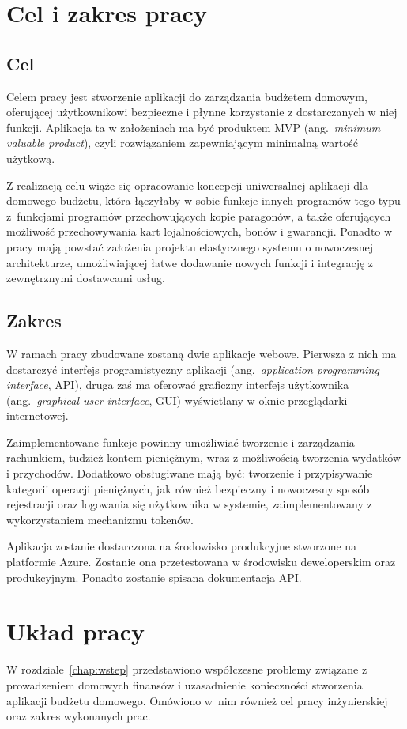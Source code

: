 \section{Cel i zakres pracy}
\label{sec:cel-zakres}
\subsection{Cel}
\label{subsec:cel}
Celem pracy jest stworzenie aplikacji do zarządzania budżetem domowym, oferującej użytkownikowi bezpieczne i płynne korzystanie z dostarczanych w niej funkcji.
Aplikacja ta w założeniach ma być produktem MVP (ang.~\emph{minimum valuable product}), czyli rozwiązaniem zapewniającym minimalną wartość użytkową.  

Z realizacją celu wiąże się opracowanie koncepcji uniwersalnej aplikacji dla domowego budżetu, która łączyłaby w sobie funkcje innych programów tego typu z~funkcjami programów przechowujących kopie paragonów, a także oferujących możliwość przechowywania kart lojalnościowych, bonów i gwarancji. 
Ponadto w pracy mają powstać założenia projektu elastycznego systemu o nowoczesnej architekturze, umożliwiającej łatwe dodawanie nowych funkcji i integrację z zewnętrznymi dostawcami usług. 

\subsection{Zakres}
\label{subsec:zakres}
W ramach pracy zbudowane zostaną dwie aplikacje webowe. Pierwsza z nich ma dostarczyć interfejs programistyczny aplikacji (ang.~\emph{application programming interface}, API), druga zaś ma oferować graficzny interfejs użytkownika (ang.~\emph{graphical user interface}, GUI) wyświetlany w oknie przeglądarki internetowej.

Zaimplementowane funkcje powinny umożliwiać tworzenie i zarządzania  rachunkiem, tudzież kontem pieniężnym, wraz z możliwością tworzenia wydatków i przychodów. Dodatkowo obsługiwane mają być: tworzenie i przypisywanie kategorii operacji pieniężnych, jak również bezpieczny i nowoczesny sposób rejestracji oraz logowania się użytkownika w systemie, zaimplementowany z wykorzystaniem mechanizmu tokenów.

Aplikacja zostanie dostarczona na środowisko produkcyjne stworzone na platformie Azure. Zostanie ona przetestowana w środowisku deweloperskim oraz produkcyjnym. Ponadto zostanie spisana dokumentacja API.

\section{Układ pracy}
\label{sec:uklad-pracy}
W rozdziale~\ref{chap:wstep} przedstawiono współczesne problemy związane z prowadzeniem domowych finansów i uzasadnienie konieczności stworzenia aplikacji budżetu domowego. Omówiono w~nim również cel pracy inżynierskiej oraz zakres wykonanych prac.

